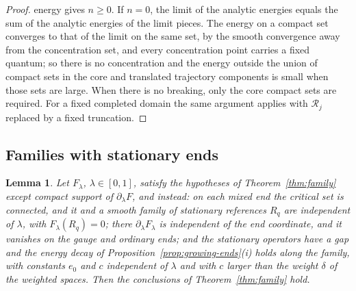 \documentclass[11pt]{amsart}
\newtheorem{lemma}[theorem]{Lemma}
\theoremstyle{definition}
\theoremstyle{remark}
\theoremstyle{plain}
\numberwithin{equation}{section}
\begin{document}
\begin{proof}
energy gives $n\ge0$. If $n=0$, the limit of the analytic energies equals the sum of the analytic
energies of the limit pieces. The energy on a compact set converges to that of the
limit on the same set, by the smooth convergence away from the concentration set,
and every concentration point carries a fixed quantum; so there is no concentration
and the energy outside the union of compact sets in the core and
translated trajectory components is small when those sets are large.
When there is no breaking, only the core compact sets are required.
For a fixed completed domain the same
argument applies with $\mathcal R_j$ replaced by a fixed truncation.
\end{proof}

\subsection{Families with stationary ends}

\begin{lemma}\label{lem:family-stationary}
Let $F_\lambda$, $\lambda\in[0,1]$, satisfy the hypotheses of
Theorem~\ref{thm:family} except compact support of $\partial_\lambda F$, and instead:
on each mixed end the critical set is connected, and it and a smooth family of
stationary references $R_q$ are independent of $\lambda$, with $F_\lambda(R_q)=0$; there $\partial_\lambda F_\lambda$
is independent of the end coordinate, and it vanishes on the gauge and ordinary
ends; and the stationary operators have a gap and the energy decay of
Proposition~\ref{prop:growing-ends}(i) holds along the family, with constants $e_0$ and $c$
independent of $\lambda$ and with $c$ larger than the weight $\delta$ of the weighted spaces. Then the
conclusions of Theorem~\ref{thm:family} hold.
\end{lemma}
\end{document}
